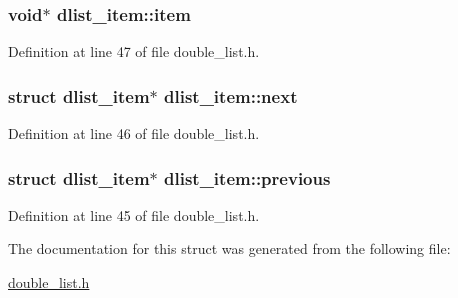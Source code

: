 \subsubsection[{item}]{\setlength{\rightskip}{0pt plus 5cm}void$\ast$ dlist\+\_\+item\+::item}\label{structdlist__item_a68a29ea7339b306a22a9ad0a0cf5a40f}


Definition at line 47 of file double\+\_\+list.\+h.

\hypertarget{structdlist__item_a1f0e35d7e536edc712977fa711d91d08}{}
\subsubsection[{next}]{\setlength{\rightskip}{0pt plus 5cm}struct {\bf dlist\+\_\+item}$\ast$ dlist\+\_\+item\+::next}\label{structdlist__item_a1f0e35d7e536edc712977fa711d91d08}


Definition at line 46 of file double\+\_\+list.\+h.

\hypertarget{structdlist__item_ae9f34aed963ea0c93ef044c826ca5081}{}
\subsubsection[{previous}]{\setlength{\rightskip}{0pt plus 5cm}struct {\bf dlist\+\_\+item}$\ast$ dlist\+\_\+item\+::previous}\label{structdlist__item_ae9f34aed963ea0c93ef044c826ca5081}


Definition at line 45 of file double\+\_\+list.\+h.



The documentation for this struct was generated from the following file\+:\begin{DoxyCompactItemize}
\item 
\hyperlink{double__list_8h}{double\+\_\+list.\+h}\end{DoxyCompactItemize}
